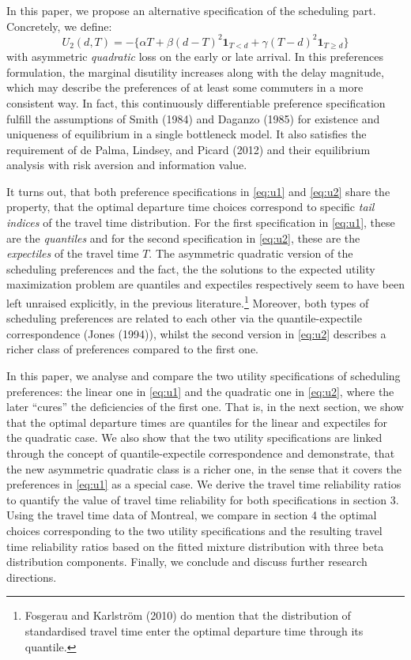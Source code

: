 \documentclass[
]{article}
\theoremstyle{definition}
\theoremstyle{definition}
\theoremstyle{definition}
\theoremstyle{definition}
\theoremstyle{remark}
\begin{document}
In this paper, we propose an alternative specification of the scheduling part. Concretely, we define:
\begin{equation}U_2(d,T) = -\{\alpha T + \beta(d-T)^2\mathbf 1_{T<d} + \gamma (T-d)^2\mathbf 1_{T\geq d}\} \label{eq:u2}
\end{equation}
with asymmetric \emph{quadratic} loss on the early or late arrival. In this preferences formulation, the marginal disutility increases along with the delay magnitude, which may describe the preferences of at least some commuters in a more consistent way. In fact, this continuously differentiable preference specification fulfill the assumptions of Smith (1984) and Daganzo (1985) for existence and uniqueness of equilibrium in a single bottleneck model. It also satisfies the requirement of de Palma, Lindsey, and Picard (2012) and their equilibrium analysis with risk aversion and information value.

It turns out, that both preference specifications in \eqref{eq:u1} and \eqref{eq:u2} share the property, that the optimal departure time choices correspond to specific \emph{tail indices} of the travel time distribution. For the first specification in \eqref{eq:u1}, these are the \emph{quantiles} and for the second specification in \eqref{eq:u2}, these are the \emph{expectiles} of the travel time \(T\). The asymmetric quadratic version of the scheduling preferences and the fact, the the solutions to the expected utility maximization problem are quantiles and expectiles respectively seem to have been left unraised explicitly, in the previous literature.\footnote{Fosgerau and Karlström (2010) do mention that the distribution of standardised travel time enter the optimal departure time through its quantile.} Moreover, both types of scheduling preferences are related to each other via the quantile-expectile correspondence (Jones (1994)), whilst the second version in \eqref{eq:u2} describes a richer class of preferences compared to the first one.

In this paper, we analyse and compare the two utility specifications of scheduling preferences: the linear one in \eqref{eq:u1} and the quadratic one in \eqref{eq:u2}, where the later ``cures'' the deficiencies of the first one. That is, in the next section, we show that the optimal departure times are quantiles for the linear and expectiles for the quadratic case. We also show that the two utility specifications are linked through the concept of quantile-expectile correspondence and demonstrate, that the new asymmetric quadratic class is a richer one, in the sense that it covers the preferences in \eqref{eq:u1} as a special case. We derive the travel time reliability ratios to quantify the value of travel time reliability for both specifications in section 3. Using the travel time data of Montreal, we compare in section 4 the optimal choices corresponding to the two utility specifications and the resulting travel time reliability ratios based on the fitted mixture distribution with three beta distribution components. Finally, we conclude and discuss further research directions.
\end{document}
